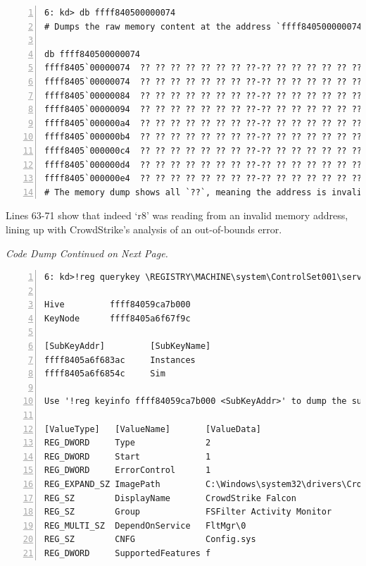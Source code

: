 \begin{lstlisting}[caption=Debugging csagent.sys Module (\# comments), numbers=left]
6: kd> db ffff840500000074
# Dumps the raw memory content at the address `ffff840500000074`.

db ffff840500000074
ffff8405`00000074  ?? ?? ?? ?? ?? ?? ?? ??-?? ?? ?? ?? ?? ?? ?? ??...
ffff8405`00000074  ?? ?? ?? ?? ?? ?? ?? ??-?? ?? ?? ?? ?? ?? ?? ??...
ffff8405`00000084  ?? ?? ?? ?? ?? ?? ?? ??-?? ?? ?? ?? ?? ?? ?? ??...
ffff8405`00000094  ?? ?? ?? ?? ?? ?? ?? ??-?? ?? ?? ?? ?? ?? ?? ??...
ffff8405`000000a4  ?? ?? ?? ?? ?? ?? ?? ??-?? ?? ?? ?? ?? ?? ?? ??...
ffff8405`000000b4  ?? ?? ?? ?? ?? ?? ?? ??-?? ?? ?? ?? ?? ?? ?? ??...
ffff8405`000000c4  ?? ?? ?? ?? ?? ?? ?? ??-?? ?? ?? ?? ?? ?? ?? ??...
ffff8405`000000d4  ?? ?? ?? ?? ?? ?? ?? ??-?? ?? ?? ?? ?? ?? ?? ??...
ffff8405`000000e4  ?? ?? ?? ?? ?? ?? ?? ??-?? ?? ?? ?? ?? ?? ?? ??...
# The memory dump shows all `??`, meaning the address is invalid or not mapped.
\end{lstlisting}

\vspace{2em}
\noindent
Lines 63-71 show that indeed `r8' was reading from an invalid memory address, lining up
with CrowdStrike's analysis of an out-of-bounds error.

\vfill
\begin{center}
    \textit{Code Dump Continued on Next Page.}
\end{center}
\vfill

\newpage


\begin{lstlisting}[caption=Inspecting csagent.sys, numbers=left]
6: kd>!reg querykey \REGISTRY\MACHINE\system\ControlSet001\services\csagent

Hive         ffff84059ca7b000
KeyNode      ffff8405a6f67f9c
    
[SubKeyAddr]         [SubKeyName]
ffff8405a6f683ac     Instances
ffff8405a6f6854c     Sim
    
Use '!reg keyinfo ffff84059ca7b000 <SubKeyAddr>' to dump the subkey details
    
[ValueType]   [ValueName]       [ValueData]
REG_DWORD     Type              2
REG_DWORD     Start             1
REG_DWORD     ErrorControl      1
REG_EXPAND_SZ ImagePath         C:\Windows\system32\drivers\CrowdStrike\csagent.sys
REG_SZ        DisplayName       CrowdStrike Falcon
REG_SZ        Group             FSFilter Activity Monitor
REG_MULTI_SZ  DependOnService   FltMgr\0
REG_SZ        CNFG              Config.sys
REG_DWORD     SupportedFeatures f
\end{lstlisting}

